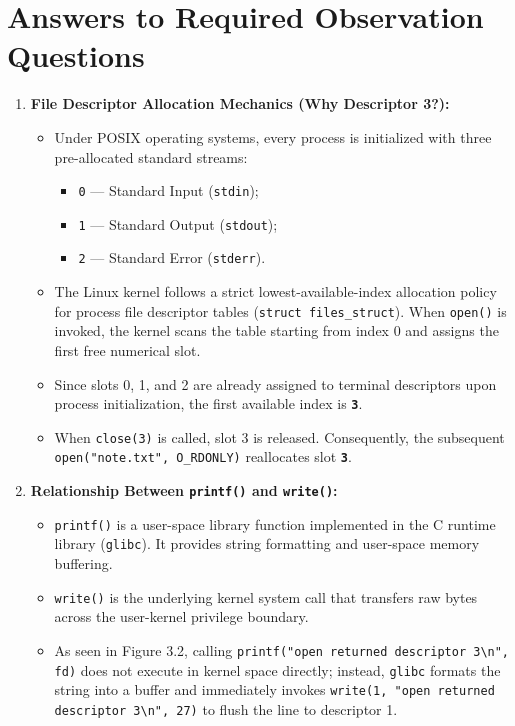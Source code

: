 \documentclass[12pt,a4paper]{report}
\numberwithin{equation}{chapter}
\numberwithin{figure}{chapter}
\numberwithin{table}{chapter}
\begin{document}
\section{Answers to Required Observation Questions}
\begin{enumerate}
    \item \textbf{File Descriptor Allocation Mechanics (Why Descriptor 3?):}
    \begin{itemize}
        \item Under POSIX operating systems, every process is initialized with three pre-allocated standard streams:
        \begin{itemize}
            \item \texttt{0} --- Standard Input (\texttt{stdin});
            \item \texttt{1} --- Standard Output (\texttt{stdout});
            \item \texttt{2} --- Standard Error (\texttt{stderr}).
        \end{itemize}
        \item The Linux kernel follows a strict lowest-available-index allocation policy for process file descriptor tables (\texttt{struct files\_struct}). When \texttt{open()} is invoked, the kernel scans the table starting from index 0 and assigns the first free numerical slot.
        \item Since slots 0, 1, and 2 are already assigned to terminal descriptors upon process initialization, the first available index is \textbf{\texttt{3}}.
        \item When \texttt{close(3)} is called, slot 3 is released. Consequently, the subsequent \texttt{open("note.txt", O\_RDONLY)} reallocates slot \textbf{\texttt{3}}.
    \end{itemize}

    \item \textbf{Relationship Between \texttt{printf()} and \texttt{write()}:}
    \begin{itemize}
        \item \texttt{printf()} is a user-space library function implemented in the C runtime library (\texttt{glibc}). It provides string formatting and user-space memory buffering.
        \item \texttt{write()} is the underlying kernel system call that transfers raw bytes across the user-kernel privilege boundary.
        \item As seen in Figure 3.2, calling \texttt{printf("open returned descriptor 3\textbackslash n", fd)} does not execute in kernel space directly; instead, \texttt{glibc} formats the string into a buffer and immediately invokes \texttt{write(1, "open returned descriptor 3\textbackslash n", 27)} to flush the line to descriptor 1.
    \end{itemize}
\end{enumerate}
\end{document}

